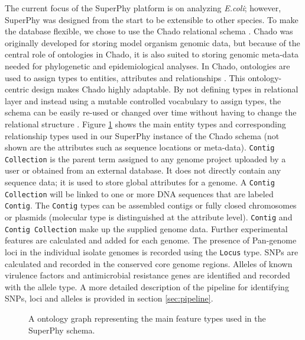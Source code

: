 \documentclass[a4paper,twoside]{article}
\begin{document}
The current focus of the SuperPhy platform is on analyzing \textit{E.coli}; however, SuperPhy was designed from the start to be extensible to other species. To make the database flexible, we chose to use the Chado relational schema \cite{mungall2007chado}. Chado was originally developed for storing model organism genomic data, but because of the central role of ontologies in Chado, it is also suited to storing genomic meta-data needed for phylogenetic and epidemiological analyses. In Chado, ontologies are used to assign types to entities, attributes and relationships \cite{mungall2007chado}. This ontology-centric design makes Chado highly adaptable. By not defining types in relational layer and instead using a mutable controlled vocabulary to assign types, the schema can be easily re-used or changed over time without having to change the relational structure \cite{mungall2007chado}.  Figure \ref{fig:ontology} shows the main entity types and corresponding relationship types used in our SuperPhy instance of the Chado schema (not shown are the attributes such as sequence locations or  meta-data). \texttt{Contig Collection} is the parent term assigned to any genome project uploaded by a user or obtained from an external database.  It does not directly contain any sequence data; it is used to store global attributes for a genome. A \texttt{Contig Collection} will be linked to one or more DNA sequences that are labeled \texttt{Contig}. The \texttt{Contig} types can be assembled contigs or fully closed chromosomes or plasmids (molecular type is distinguished at the attribute level). \texttt{Contig} and \texttt{Contig Collection} make up the supplied genome data. Further experimental features are calculated and added for each genome. The presence of Pan-genome loci in the individual isolate genomes is recorded using the \texttt{Locus} type. SNPs are calculated and recorded in the conserved core genome regions. Alleles of known virulence factors and antimicrobial resistance genes are identified and recorded with the allele type.  A more detailed description of the pipeline for identifying SNPs, loci and alleles is provided in section \ref{sec:pipeline}.

\begin{figure}[t]
  \vspace{-0.2cm}
  \centering
   {}
  \caption{A ontology graph representing the main feature types used in the SuperPhy schema.}
  \label{fig:ontology}
\end{figure}
\end{document}
